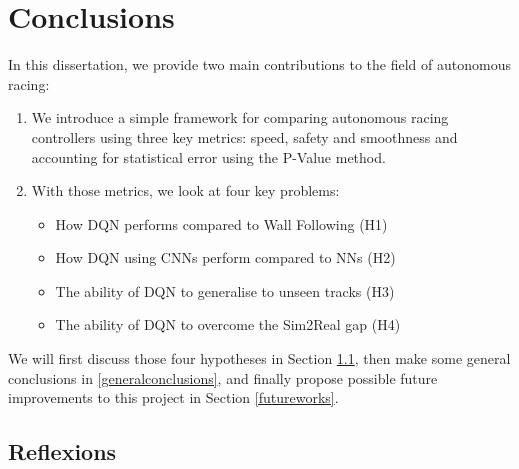 
\chapter{Conclusions} %

\label{Chapter8} %



In this dissertation, we provide two main contributions to the field of autonomous racing:

\begin{enumerate}
	\item We introduce a simple framework for comparing autonomous racing controllers using three key metrics: speed, safety and smoothness and accounting for statistical error using the P-Value method.
	\item With those metrics, we look at four key problems:
	\begin{itemize}
		\item How DQN performs compared to Wall Following (H1)
		\item How DQN using CNNs perform compared to NNs (H2)
		\item The ability of DQN to generalise to unseen tracks (H3)
		\item The ability of DQN to overcome the Sim2Real gap (H4)
	\end{itemize}
\end{enumerate}

We will first discuss those four hypotheses in Section \ref{reflexions}, then make some general conclusions in \ref{generalconclusions}, and finally propose possible future improvements to this project in Section \ref{futureworks}.

\section{Reflexions}
\label{reflexions}


